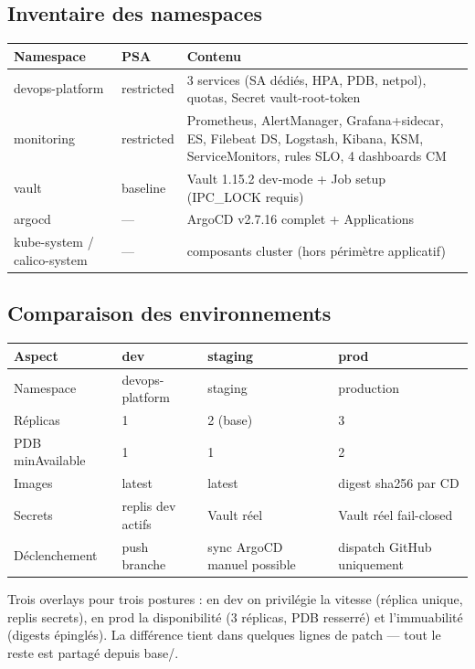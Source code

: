 \documentclass[12pt,a4paper]{article}
\begin{document}
\subsection{Inventaire des namespaces}
\begin{longtable}{@{}p{3.4cm}p{2.6cm}p{8.0cm}@{}}
\toprule
\textbf{Namespace} & \textbf{PSA} & \textbf{Contenu} \\
\midrule
\endhead
devops-platform & restricted & 3 services (SA dédiés, HPA, PDB, netpol), quotas, Secret vault-root-token \\
monitoring & restricted & Prometheus, AlertManager, Grafana+sidecar, ES, Filebeat DS, Logstash, Kibana, KSM, ServiceMonitors, rules SLO, 4 dashboards CM \\
vault & baseline & Vault 1.15.2 dev-mode + Job setup (IPC\_LOCK requis) \\
argocd & --- & ArgoCD v2.7.16 complet + Applications \\
kube-system / calico-system & --- & composants cluster (hors périmètre applicatif) \\
\bottomrule
\end{longtable}

\subsection{Comparaison des environnements}
\begin{longtable}{@{}p{3.0cm}p{3.6cm}p{3.6cm}p{3.8cm}@{}}
\toprule
\textbf{Aspect} & \textbf{dev} & \textbf{staging} & \textbf{prod} \\
\midrule
\endhead
Namespace & devops-platform & staging & production \\
Réplicas & 1 & 2 (base) & 3 \\
PDB minAvailable & 1 & 1 & 2 \\
Images & latest & latest & digest sha256 par CD \\
Secrets & replis dev actifs & Vault réel & Vault réel fail-closed \\
Déclenchement & push branche & sync ArgoCD manuel possible & dispatch GitHub uniquement \\
\bottomrule
\end{longtable}

\begin{whybox}
Trois overlays pour trois postures : en dev on privilégie la vitesse (réplica unique, replis secrets), en prod la disponibilité (3 réplicas, PDB resserré) et l'immuabilité (digests épinglés). La différence tient dans quelques lignes de patch --- tout le reste est partagé depuis base/.
\end{whybox}
\end{document}
